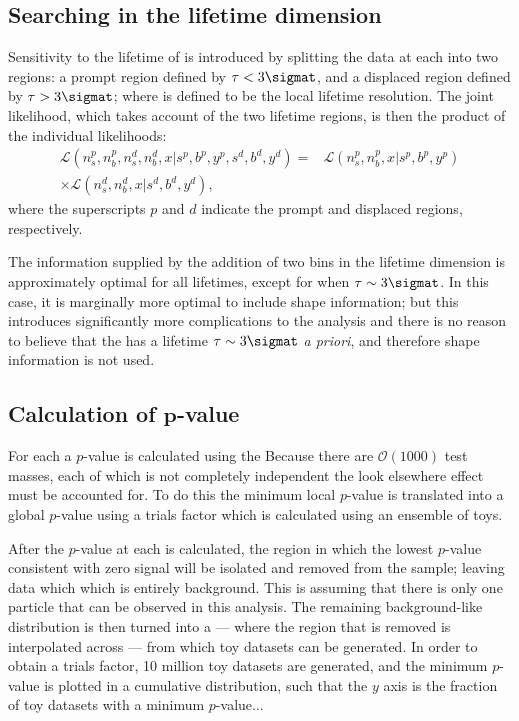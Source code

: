 \subsection{Searching in the lifetime dimension}
Sensitivity to the lifetime of \db is introduced by splitting the data at each  into two
regions: a prompt region defined by $\tau<3\sigmat$, and a displaced region defined by
$\tau>3\sigmat$; where \sigmat is defined to be the local lifetime resolution.
The joint likelihood, which takes account of the two lifetime regions, is then the product of the
individual likelihoods:
\begin{align}
  \mathcal{L}(n^p_s, n^p_b, n^d_s, n^d_b, x | s^p, b^p, y^p, s^d, b^d, y^d) =&
  \mathcal{L}(n^p_s, n^p_b, x | s^p, b^p, y^p)\\\nonumber
  \times\mathcal{L}(n^d_s, n^d_b, x | s^d, b^d, y^d),
  \label{eq:db:liketau}
\end{align}
where the superscripts $p$ and $d$ indicate the prompt and displaced regions, respectively.

The information supplied by the addition of two bins in the lifetime dimension is approximately
optimal for all \db lifetimes, except for when $\tau\sim3\sigmat$.
In this case, it is marginally more optimal to include shape information; but this introduces
significantly more complications to the analysis and there is no reason to believe that the \db has
a lifetime $\tau\sim3\sigmat$ \emph{a priori}, and therefore shape information is not used.




\subsection[Calculation of $p$-value]
{Calculation of $\boldsymbol{p}$-value}
For each  a $p$-value is calculated using the
Because there are $\mathcal{O}(1000)$ test masses, each of which is not completely independent the
look elsewhere effect must be accounted for.
To do this the minimum local $p$-value is translated into a global $p$-value using a trials factor
which is calculated using an ensemble of toys.

After the $p$-value at each  is calculated, the region in which the lowest $p$-value
consistent with zero signal will be isolated and removed from the sample; leaving data which
which is entirely background.
This is assuming that there is only one \np particle that can be observed in this analysis.
The remaining background-like distribution is then turned into a \PDF --- where the region that is
removed is interpolated across --- from which toy datasets can be generated.
In order to obtain a trials factor, 10 million toy datasets are generated, and the minimum
$p$-value is plotted in a cumulative distribution, such that the $y$ axis is the fraction of toy
datasets with a minimum $p$-value...











